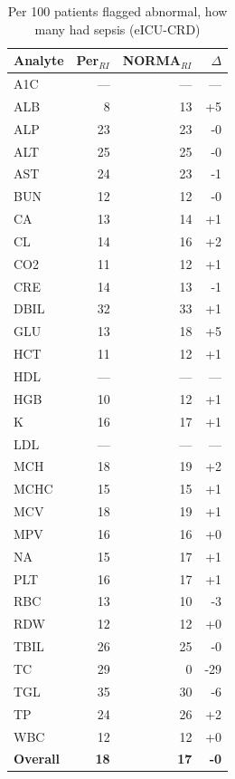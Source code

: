 \begin{table}[ht]
\centering
\footnotesize
\caption{Per 100 patients flagged abnormal, how many had sepsis (eICU-CRD)}
\begin{tabular}{lrrr}
\toprule
Analyte & Per$_{RI}$ & NORMA$_{RI}$ & $\Delta$ \\
\midrule
A1C & --- & --- & --- \\
ALB & 8 & 13 & +5 \\
ALP & 23 & 23 & -0 \\
ALT & 25 & 25 & -0 \\
AST & 24 & 23 & -1 \\
BUN & 12 & 12 & -0 \\
CA & 13 & 14 & +1 \\
CL & 14 & 16 & +2 \\
CO2 & 11 & 12 & +1 \\
CRE & 14 & 13 & -1 \\
DBIL & 32 & 33 & +1 \\
GLU & 13 & 18 & +5 \\
HCT & 11 & 12 & +1 \\
HDL & --- & --- & --- \\
HGB & 10 & 12 & +1 \\
K & 16 & 17 & +1 \\
LDL & --- & --- & --- \\
MCH & 18 & 19 & +2 \\
MCHC & 15 & 15 & +1 \\
MCV & 18 & 19 & +1 \\
MPV & 16 & 16 & +0 \\
NA & 15 & 17 & +1 \\
PLT & 16 & 17 & +1 \\
RBC & 13 & 10 & -3 \\
RDW & 12 & 12 & +0 \\
TBIL & 26 & 25 & -0 \\
TC & 29 & 0 & -29 \\
TGL & 35 & 30 & -6 \\
TP & 24 & 26 & +2 \\
WBC & 12 & 12 & +0 \\
\midrule
\textbf{Overall} & \textbf{18} & \textbf{17} & \textbf{-0} \\
\bottomrule
\end{tabular}
\end{table}